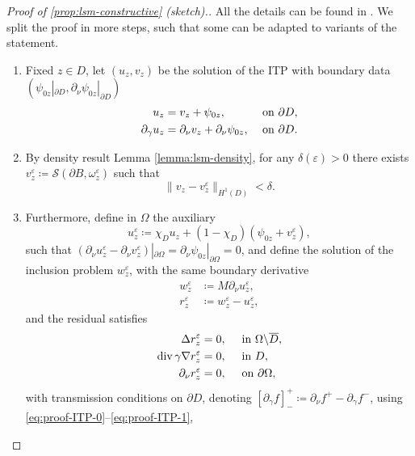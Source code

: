 \documentclass[10pt, a4paper, twoside, openright]{book}
\theoremstyle{definition}
\theoremstyle{plain}
\theoremstyle{plain}
\theoremstyle{plain}
\theoremstyle{plain}
\theoremstyle{plain}
\theoremstyle{plain}
\theoremstyle{plain}
\theoremstyle{plain}
\DeclareMathOperator{\divergence}{div}
\let\epsilon\varepsilon
\begin{document}
\begin{proof}
 [Proof of \ref{prop:lsm-constructive} (sketch).]
 All the details can be found in \cite{somersalo:preprint}. We split the proof in more steps, such that some can be adapted to variants of the statement.
 \begin{enumerate}
  \item Fixed $z\in D$, let $(u_z, v_z)$ be the solution of the ITP with boundary data $(\psi_{0z}|_{\partial D}, \partial_\nu\psi_{0z}|_{\partial D})$
  \begin{subequations}
  \begin{align}
   u_z &= v_z + \psi_{0z}, &&\textup{ on }\partial D,  \label{eq:proof-ITP-0} \\
   \partial_\gamma u_z &= \partial_\nu v_z + \partial_\nu \psi_{0z}, &&\textup{ on }\partial D. \label{eq:proof-ITP-1}
  \end{align}
  \end{subequations}
  \item By density result Lemma \ref{lemma:lsm-density}, for any $\delta(\epsilon)>0$ there exists $v^\epsilon_z\coloneqq\mathcal{S}(\partial B, \omega^\epsilon_z)$ such that
  \begin{equation}
   \|v_z-v_z^\epsilon\|_{H^1(D)}<\delta.
  \end{equation}
  \item Furthermore, define in $\Omega$ the auxiliary 
  \begin{equation}
   u^\epsilon_z\coloneqq\chi_Du_z + (1-\chi_D)(\psi_{0z} + v^\epsilon_z),
  \end{equation}
  such that $(\partial_\nu u^\epsilon_z -\partial_\nu v^\epsilon_z )|_{\partial\Omega}=\partial_\nu\psi_{0z}|_{\partial\Omega}=0$, and define the solution of the inclusion problem $w^\epsilon_z$, with the same boundary derivative
  \begin{align}
   w^\epsilon_z&\coloneqq M\partial_\nu u^\epsilon_z, \\
   r^\epsilon_z&\coloneqq w^\epsilon_z - u^\epsilon_z,
  \end{align}
  and the residual satisfies 
  \begin{align}
  \Delta r^\epsilon_z & = 0, \quad \textup{ in }\Omega\backslash\overline{D}, \\
  \divergence\gamma\nabla r^\epsilon_z &= 0,  \quad \textup{ in }D, \\
  \partial_\nu r^\epsilon_z &=0, \quad \textup{ on }\partial \Omega,
  \end{align}
  with transmission conditions on $\partial D$, denoting $[\partial_\gamma f]^+_- \coloneqq \partial_\nu f^+ - \partial_\gamma f^-$, using \eqref{eq:proof-ITP-0}--\eqref{eq:proof-ITP-1},

\end{enumerate}
\end{proof}
\end{document}
